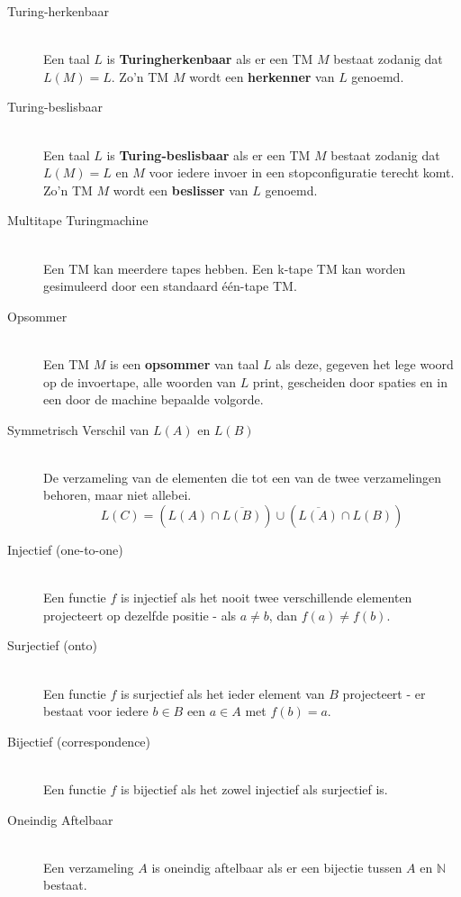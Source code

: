 \documentclass[]{article}
\begin{document}
\begin{itemize}
\begin{description}
	\item[Turing-herkenbaar] \hfill \\
	Een taal $L$ is \textbf{Turingherkenbaar} als er een TM $M$ bestaat zodanig dat $L(M) = L$. Zo'n TM $M$ wordt een \textbf{herkenner} van $L$ genoemd.
	
	\item[Turing-beslisbaar] \hfill \\
	Een taal $L$ is \textbf{Turing-beslisbaar} als er een TM $M$ bestaat zodanig dat $L(M) = L$ en $M$ voor iedere invoer in een stopconfiguratie terecht komt. Zo'n TM $M$ wordt een \textbf{beslisser} van $L$ genoemd.
	
	\item[Multitape Turingmachine] \hfill \\
	Een TM kan meerdere tapes hebben. Een k-tape TM kan worden gesimuleerd door een standaard \'{e}\'{e}n-tape TM.
	
	\item[Opsommer] \hfill \\
	Een TM $M$ is een \textbf{opsommer} van taal $L$ als deze, gegeven het lege woord op de invoertape, alle woorden van $L$ print, gescheiden door spaties en in een door de machine bepaalde volgorde.
	
	\item[Symmetrisch Verschil van $L(A)$ en $L(B)$] \hfill \\
	De verzameling van de elementen die tot een van de twee verzamelingen behoren, maar niet allebei.
	$$L(C) = \left( L(A) \cap \overline{L(B)} \right) \cup \left( \overline{L(A)} \cap L(B) \right)$$
	
	\item[Injectief (one-to-one)] \hfill \\
	Een functie $f$ is injectief als het nooit twee verschillende elementen projecteert op dezelfde positie - als $a \neq b$, dan $f(a) \neq f(b)$.
	
	\item[Surjectief (onto)] \hfill \\
	Een functie $f$ is surjectief als het ieder element van $B$ projecteert - er bestaat voor iedere $b \in B$ een $a \in A$ met $f(b) = a$.
	
	\item[Bijectief (correspondence)] \hfill \\
	Een functie $f$ is bijectief als het zowel injectief als surjectief is.
	
	\item[Oneindig Aftelbaar] \hfill \\
	Een verzameling $A$ is oneindig aftelbaar als er een bijectie tussen $A$ en $\mathbb{N}$ bestaat.
	

\end{description}
\end{itemize}
\end{document}
